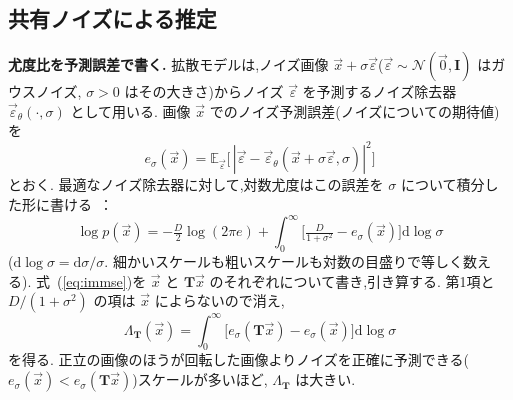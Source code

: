 \documentclass[MIRU,submit,onecolumn]{miru2025j}
\newcommand{\veps}{\vec{\varepsilon}}
\newcommand{\epsth}{\vec{\varepsilon}_\theta}
\newcommand{\E}{\mathbb{E}}
\newcommand{\dd}{\mathrm{d}}
\newcommand{\mT}{\mathbf{T}}            %
\newcommand{\mI}{\mathbf{I}}
\renewcommand{\eqref}[1]{(\ref{#1})}   %
\begin{document}
\subsection{共有ノイズによる推定}
\label{sec:est}

\textbf{尤度比を予測誤差で書く.}
拡散モデルは,ノイズ画像 $\vec{x}+\sigma\veps$($\veps\sim\mathcal{N}(\vec{0},\mI)$ はガウスノイズ, $\sigma>0$ はその大きさ)からノイズ $\veps$ を予測するノイズ除去器 $\epsth(\cdot,\sigma)$ として用いる. %
画像 $\vec{x}$ でのノイズ予測誤差(ノイズについての期待値)を
\begin{equation}
e_\sigma(\vec{x})=\E_{\veps}\big[\,|\veps-\epsth(\vec{x}+\sigma\veps,\sigma)|^2\big]
\label{eq:err}
\end{equation}
とおく. 最適なノイズ除去器に対して,対数尤度はこの誤差を $\sigma$ について積分した形に書ける~\cite{kong2023itd}：
\begin{equation}
\log p(\vec{x})=-\tfrac D2\log(2\pi e)+\!\int_0^\infty\!\big[\tfrac{D}{1+\sigma^2}-e_\sigma(\vec{x})\big]\dd\log\sigma
\label{eq:immse}
\end{equation}
($\dd\log\sigma=\dd\sigma/\sigma$. 細かいスケールも粗いスケールも対数の目盛りで等しく数える). %
式~\eqref{eq:immse}を $\vec{x}$ と $\mT\vec{x}$ のそれぞれについて書き,引き算する. 第1項と $D/(1+\sigma^2)$ の項は $\vec{x}$ によらないので消え,
\begin{equation}
\Lambda_{\mT}(\vec{x})=\int_0^\infty\big[e_\sigma(\mT\vec{x})-e_\sigma(\vec{x})\big]\dd\log\sigma
\label{eq:llr}
\end{equation}
を得る. 正立の画像のほうが回転した画像よりノイズを正確に予測できる($e_\sigma(\vec{x})<e_\sigma(\mT\vec{x})$)スケールが多いほど, $\Lambda_{\mT}$ は大きい.
\end{document}
